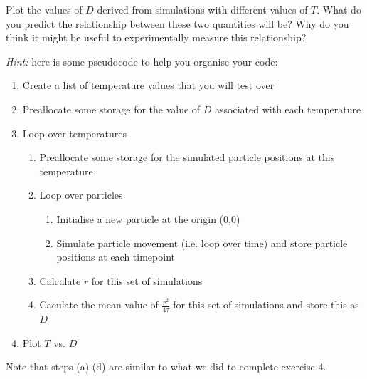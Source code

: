 \documentclass[11pt, oneside]{article}
\begin{document}
	Plot the values of $D$ derived from simulations with different values of $T$. What do you predict the relationship between these two quantities will be? Why do you think it might be useful to experimentally measure this relationship?
	
	\textit{Hint:} here is some pseudocode to help you organise your code:
	
	\begin{enumerate}
		\item Create a list of temperature values that you will test over
		\item Preallocate some storage for the value of $D$ associated with each temperature
		\item Loop over temperatures
		\begin{enumerate}
			\item Preallocate some storage for the simulated particle positions at this temperature
			\item Loop over particles
			\begin{enumerate}
				\item Initialise a new particle at the origin (0,0)
				\item Simulate particle movement (i.e. loop over time) and store particle positions at each timepoint
			\end{enumerate}
			\item Calculate $r$ for this set of simulations
			\item Caculate the mean value of $\frac{r^2}{4\tau}$ for this set of simulations and store this as $D$
		\end{enumerate}
		\item Plot $T$ vs. $D$
	\end{enumerate}
	
	Note that steps (a)-(d) are similar to what we did to complete exercise 4.	
	
\end{document}
